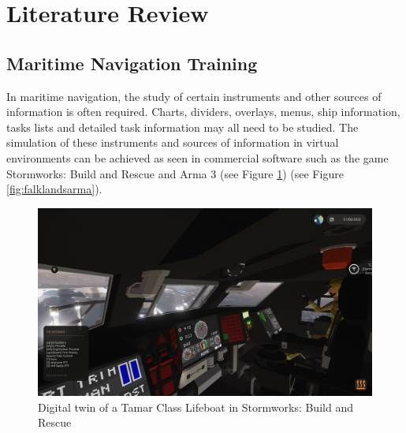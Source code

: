 \documentclass[12pt]{article}
\begin{document}
\section{Literature Review}

\subsection{Maritime Navigation Training}

In maritime navigation, the study of certain instruments and other sources of information is often required. Charts, dividers, overlays, menus, ship information, tasks lists and detailed task information may all need to be studied. \cite{atik2019use} The simulation of these instruments and sources of information in virtual environments can be achieved as seen in commercial software such as the game Stormworks: Build and Rescue \cite{stormworks} and Arma 3 \cite{arma3} (see Figure \ref{fig:tamarclassstormworks}) (see Figure \ref{fig:falklandsarma}).

\begin{figure}[h]
  \centering
  \begin{minipage}[b]{0.9\linewidth}
    \includegraphics[width=\linewidth]{images/tamar-class-lifeboat-stormworks.jpg}
    \caption{Digital twin of a Tamar Class Lifeboat in Stormworks: Build and Rescue}
    \label{fig:tamarclassstormworks}
  \end{minipage}
\end{figure}
\end{document}
